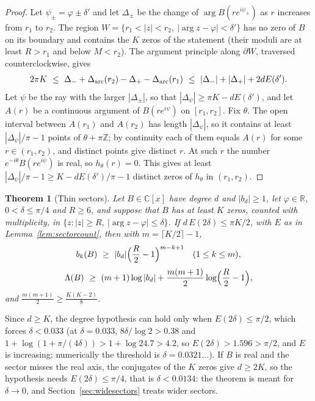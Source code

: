 \documentclass[11pt]{article}
\newtheorem{theorem}{Theorem}[section]
\newcommand{\R}{\mathbb R}
\begin{document}
\begin{proof}
Let $\psi_\pm=\varphi\pm\delta'$ and let $\Delta_\pm$ be the change of
$\arg B(re^{i\psi_\pm})$ as $r$ increases from $r_1$ to $r_2$.  The region
$W=\{r_1<|z|<r_2,\ |\arg z-\varphi|<\delta'\}$ has no zero of $B$ on its
boundary and contains the $K$ zeros of the statement (their moduli are at
least $R>r_1$ and below $M<r_2$).  The argument principle along
$\partial W$, traversed counterclockwise, gives
\[
  2\pi K\ \le\ \Delta_-+\Delta_{\rm arc}(r_2)-\Delta_+-\Delta_{\rm arc}(r_1)
  \ \le\ |\Delta_-|+|\Delta_+|+2dE(\delta').
\]
Let $\psi$ be the ray with the larger $|\Delta_\pm|$, so that
$|\Delta_\psi|\ge\pi K-dE(\delta')$, and let $A(r)$ be a continuous argument of
$B(re^{i\psi})$ on $[r_1,r_2]$.  Fix $\theta$.  The open interval between
$A(r_1)$ and $A(r_2)$ has length $|\Delta_\psi|$, so it contains at least
$|\Delta_\psi|/\pi-1$ points of $\theta+\pi\mathbb Z$; by continuity each of
them equals $A(r)$ for some $r\in(r_1,r_2)$, and distinct points give distinct
$r$.  At such $r$ the number $e^{-i\theta}B(re^{i\psi})$ is real, so
$h_\theta(r)=0$.  This gives at least $|\Delta_\psi|/\pi-1\ge K-dE(\delta')/\pi-1$
distinct zeros of $h_\theta$ in $(r_1,r_2)$.
\end{proof}

\begin{theorem}[Thin sectors]\label{thm:thinsector}
Let $B\in\mathbb C[x]$ have degree $d$ and $|b_d|\ge1$, let $\varphi\in\R$,
$0<\delta\le\pi/4$ and $R\ge6$, and suppose that $B$ has at least $K$ zeros,
counted with multiplicity, in $\{z:|z|\ge R,\ |\arg z-\varphi|\le\delta\}$.  If
$d\,E(2\delta)\le\pi K/2$, with $E$ as in Lemma~\ref{lem:sectorcount}, then
with $m=\lceil K/2\rceil-1$,
\[
  b_k(B)\ \ge\ |b_d|\Bigl(\frac R2-1\Bigr)^{m-k+1}\quad(1\le k\le m),
\]
\[
  \Lambda(B)\ \ge\ (m+1)\log|b_d|+\frac{m(m+1)}2\log\Bigl(\frac R2-1\Bigr),
\]
and $\frac{m(m+1)}2\ge\frac{K(K-2)}8$.
\end{theorem}

Since $d\ge K$, the degree hypothesis can hold only when
$E(2\delta)\le\pi/2$, which forces $\delta<0.033$ (at $\delta=0.033$,
$8\delta/\log2>0.38$ and $1+\log(1+\pi/(4\delta))>1+\log24.7>4.2$, so
$E(2\delta)>1.596>\pi/2$, and $E$ is increasing; numerically the threshold
is $\delta=0.0321\ldots$).  If $B$ is real and the sector misses the real
axis, the conjugates of the $K$ zeros give $d\ge2K$, so the hypothesis needs
$E(2\delta)\le\pi/4$, that is $\delta<0.0134$: the theorem is meant for
$\delta\to0$, and Section~\ref{sec:widesectors} treats wider sectors.
\end{document}
